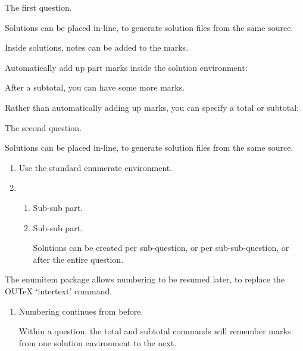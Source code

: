 \documentclass{ouexam}
\begin{document}
\maketitle



The first question.

\begin{solution}
Solutions can be placed in-line, to generate solution files from the same source.

Inside solutions, notes can be added to the marks.

Automatically add up part marks inside the solution environment:

\subtotal*[]

After a subtotal, you can have some more marks.

Rather than automatically adding up marks, you can specify a total or subtotal: 


\total*
\end{solution}

\question
The second question.

\begin{solution}
Solutions can be placed in-line, to generate solution files from the same source.
\end{solution}


\begin{enumerate}
\item Use the standard enumerate environment.
\item \begin{enumerate}
\item Sub-sub part.
\item Sub-sub part.
\begin{solution}
Solutions can be created per sub-question, or per sub-sub-question, or after the entire question.

\end{solution}
\end{enumerate}
\end{enumerate}
The enumitem package allows numbering to be resumed later, to replace the OUTeX `intertext' command.
\begin{enumerate}[resume]
\item Numbering continues from before.
\begin{solution}
Within a question, the total and subtotal commands will remember marks from one solution environment to the next.

\total*
\end{solution}
\end{enumerate}
\end{document}
